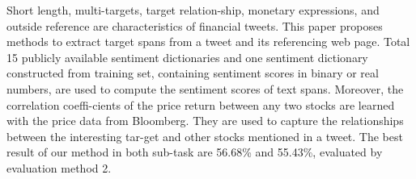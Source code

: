 Short length, multi-targets, target relation-ship, monetary expressions, and outside reference are characteristics of financial tweets. This paper proposes methods to extract target spans from a tweet and its referencing web page. Total 15 publicly available sentiment dictionaries and one sentiment dictionary constructed from training set, containing sentiment scores in binary or real numbers, are used to compute the sentiment scores of text spans. Moreover, the correlation coeffi-cients of the price return between any two stocks are learned with the price data from Bloomberg. They are used to capture the relationships between the interesting tar-get and other stocks mentioned in a tweet. The best result of our method in both sub-task are 56.68\% and 55.43\%, evaluated by evaluation method 2.
